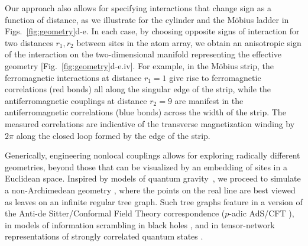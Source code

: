 \documentclass[aps,pra,superscriptaddress,12pt]{revtex4-1} %
\begin{document}
\begin{bibunit}
Our approach also allows for specifying interactions that change sign as a function of distance, as we illustrate for the cylinder and the M\"{o}bius ladder in Figs.~\ref{fig:geometry}d-e.  In each case, by choosing opposite signs of interaction for two distances $r_1, r_2$ between sites in the atom array, we obtain an anisotropic sign of the interaction on the two-dimensional manifold representing the effective geometry [Fig.~\ref{fig:geometry}d-e.iv].  For example, in the M\"{o}bius strip, the ferromagnetic interactions at distance $r_1 = 1$ give rise to ferromagnetic correlations (red bonds) all along the singular edge of the strip, while the antiferromagnetic couplings at distance $r_2=9$ are manifest in the antiferromagnetic correlations (blue bonds) across the width of the strip.  The measured correlations are indicative of the transverse magnetization winding by $2\pi$ along the closed loop formed by the edge of the strip.

Generically, engineering nonlocal couplings allows for exploring radically different geometries, beyond those that can be visualized by an embedding of sites in a Euclidean space.  Inspired by models of quantum gravity~\cite{gubser2017p,heydeman2016tensor}, we proceed to simulate a non-Archimedean geometry \cite{gubser2018continuum,bentsen2019treelike}, where the points on the real line are best viewed as leaves on an infinite regular tree graph.  Such tree graphs feature in a version of the Anti-de Sitter/Conformal Field Theory correspondence ($p$-adic AdS/CFT  \cite{gubser2017p,heydeman2016tensor}), in models of information scrambling in black holes \cite{barbon2013fast}, and in tensor-network representations of strongly correlated quantum states \cite{shi2006classical,murg2010simulating}.


\end{bibunit}
\end{document}
